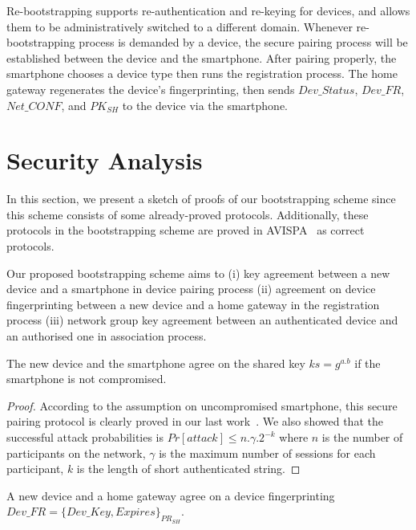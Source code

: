 Re-bootstrapping supports re-authentication and re-keying for devices, and allows them to be administratively switched to a different domain. Whenever re-bootstrapping process is demanded by a device, the secure pairing process will be established between the device and the smartphone. After pairing properly, the smartphone chooses a device type then runs the registration process. The home gateway regenerates the device's fingerprinting, then sends $Dev\_Status$, $Dev\_FR$, $Net\_CONF$, and $PK_{SH}$ to the device via the smartphone. 
 
\section{Security Analysis}\label{validation}

In this section, we present a sketch of proofs of our bootstrapping scheme since this scheme consists of some already-proved protocols. Additionally, these protocols in the bootstrapping scheme are proved in AVISPA~\cite{Armando:2005:ATA:2153230.2153265} as correct protocols. 

Our proposed bootstrapping scheme aims to (i) key agreement between a new device and a smartphone in device pairing process (ii) agreement on device fingerprinting between a new device and a home gateway in the registration process (iii) network group key agreement between an authenticated device and an authorised one in association process. 

\begin{Proposition}\label{ntandsp}
The new device and the smartphone agree on the shared key $ks= g^{a.b}$ if the smartphone is not compromised. 
\end{Proposition}

\begin{proof}

According to the assumption on uncompromised smartphone, this secure pairing protocol is clearly proved in our last work~\cite{7158026}. We also showed that the successful attack probabilities is $Pr[attack] \leq n.\gamma.2^{-k}$ where $n$ is the number of participants on the network, $\gamma$ is the maximum number of sessions for each participant, $k$ is the length of short authenticated string.
\end{proof}

\begin{Proposition}\label{newandsh}
A new device and a home gateway agree on a device fingerprinting $Dev\_FR = \{Dev\_Key, Expires\}_{PR_{SH}}$. 
\end{Proposition}

